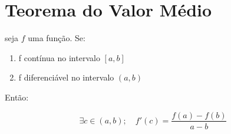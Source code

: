 \section{Teorema do Valor Médio}
\begin{theorem}
    seja \(f\) uma função. Se:
    \begin{enumerate}
        \item f contínua no intervalo \( [a,b] \)
        \item f diferenciável no intervalo \( (a,b) \)
    \end{enumerate}
    Então:
    
    \begin{equation}
        \exists c \in (a,b);\quad f'(c) = \frac{f(a) - f(b)}{a - b}
    \end{equation}    
\end{theorem}